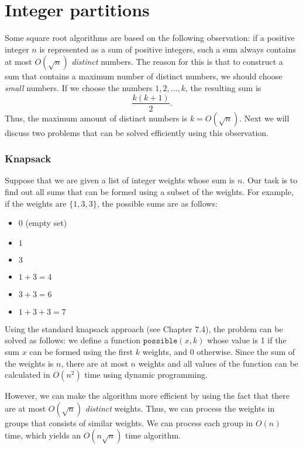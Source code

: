 \section{Integer partitions}

Some square root algorithms are based on
the following observation:
if a positive integer $n$ is represented as
a sum of positive integers,
such a sum always contains at most
$O(\sqrt n)$ \emph{distinct} numbers.
The reason for this is that to construct
a sum that contains a maximum number of distinct
numbers, we should choose \emph{small} numbers.
If we choose the numbers $1,2,\ldots,k$,
the resulting sum is
\[\frac{k(k+1)}{2}.\]
Thus, the maximum amount of distinct numbers is $k = O(\sqrt n)$.
Next we will discuss two problems that can be solved
efficiently using this observation.

\subsubsection{Knapsack}

Suppose that we are given a list of integer weights
whose sum is $n$.
Our task is to find out all sums that can be formed using
a subset of the weights. For example, if the weights are
$\{1,3,3\}$, the possible sums are as follows:

\begin{itemize}[noitemsep]
\item $0$ (empty set)
\item $1$
\item $3$
\item $1+3=4$
\item $3+3=6$
\item $1+3+3=7$
\end{itemize}

Using the standard knapsack approach (see Chapter 7.4),
the problem can be solved as follows:
we define a function $\texttt{possible}(x,k)$ whose value is 1
if the sum $x$ can be formed using the first $k$ weights,
and 0 otherwise.
Since the sum of the weights is $n$,
there are at most $n$ weights and
all values of the function can be calculated
in $O(n^2)$ time using dynamic programming.

However, we can make the algorithm more efficient
by using the fact that there are at most $O(\sqrt n)$
\emph{distinct} weights.
Thus, we can process the weights in groups
that consists of similar weights.
We can process each group
in $O(n)$ time, which yields an $O(n \sqrt n)$ time algorithm.


